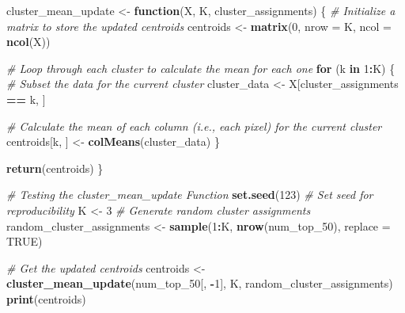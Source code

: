 \documentclass[
]{article}
\newenvironment{Shaded}{\begin{snugshade}}{\end{snugshade}}
\newcommand{\AttributeTok}[1]{\textcolor[rgb]{0.13,0.29,0.53}{#1}}
\newcommand{\CommentTok}[1]{\textcolor[rgb]{0.56,0.35,0.01}{\textit{#1}}}
\newcommand{\ConstantTok}[1]{\textcolor[rgb]{0.56,0.35,0.01}{#1}}
\newcommand{\ControlFlowTok}[1]{\textcolor[rgb]{0.13,0.29,0.53}{\textbf{#1}}}
\newcommand{\DecValTok}[1]{\textcolor[rgb]{0.00,0.00,0.81}{#1}}
\newcommand{\FunctionTok}[1]{\textcolor[rgb]{0.13,0.29,0.53}{\textbf{#1}}}
\newcommand{\NormalTok}[1]{#1}
\newcommand{\OtherTok}[1]{\textcolor[rgb]{0.56,0.35,0.01}{#1}}
\newcommand{\SpecialCharTok}[1]{\textcolor[rgb]{0.81,0.36,0.00}{\textbf{#1}}}
\begin{document}
\begin{Shaded}
\begin{Highlighting}[]
\NormalTok{cluster\_mean\_update }\OtherTok{\textless{}{-}} \ControlFlowTok{function}\NormalTok{(X, K, cluster\_assignments) \{}
  \CommentTok{\# Initialize a matrix to store the updated centroids}
\NormalTok{  centroids }\OtherTok{\textless{}{-}} \FunctionTok{matrix}\NormalTok{(}\DecValTok{0}\NormalTok{, }\AttributeTok{nrow =}\NormalTok{ K, }\AttributeTok{ncol =} \FunctionTok{ncol}\NormalTok{(X))}
  
  \CommentTok{\# Loop through each cluster to calculate the mean for each one}
  \ControlFlowTok{for}\NormalTok{ (k }\ControlFlowTok{in} \DecValTok{1}\SpecialCharTok{:}\NormalTok{K) \{}
    \CommentTok{\# Subset the data for the current cluster}
\NormalTok{    cluster\_data }\OtherTok{\textless{}{-}}\NormalTok{ X[cluster\_assignments }\SpecialCharTok{==}\NormalTok{ k, ]}
    
    \CommentTok{\# Calculate the mean of each column (i.e., each pixel) for the current cluster}
\NormalTok{    centroids[k, ] }\OtherTok{\textless{}{-}} \FunctionTok{colMeans}\NormalTok{(cluster\_data)}
\NormalTok{  \}}
  
  \FunctionTok{return}\NormalTok{(centroids)}
\NormalTok{\}}
\end{Highlighting}
\end{Shaded}

\begin{Shaded}
\begin{Highlighting}[]
\CommentTok{\# Testing the cluster\_mean\_update Function}
\FunctionTok{set.seed}\NormalTok{(}\DecValTok{123}\NormalTok{)  }\CommentTok{\# Set seed for reproducibility}
\NormalTok{K }\OtherTok{\textless{}{-}} \DecValTok{3}
\CommentTok{\# Generate random cluster assignments}
\NormalTok{random\_cluster\_assignments }\OtherTok{\textless{}{-}} \FunctionTok{sample}\NormalTok{(}\DecValTok{1}\SpecialCharTok{:}\NormalTok{K, }\FunctionTok{nrow}\NormalTok{(num\_top\_50), }\AttributeTok{replace =} \ConstantTok{TRUE}\NormalTok{)}

\CommentTok{\# Get the updated centroids}
\NormalTok{centroids }\OtherTok{\textless{}{-}} \FunctionTok{cluster\_mean\_update}\NormalTok{(num\_top\_50[, }\SpecialCharTok{{-}}\DecValTok{1}\NormalTok{], K, random\_cluster\_assignments)}
\FunctionTok{print}\NormalTok{(centroids)}
\end{Highlighting}
\end{Shaded}
\end{document}
